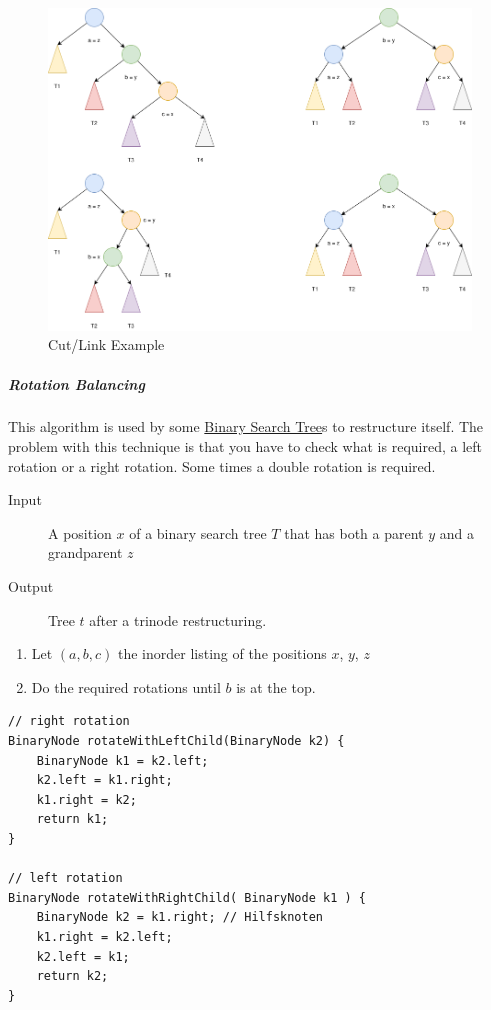 \documentclass[11pt,twoside,twocolumn,landscape]{article}
\begin{document}
\begin{figure}[htbp]
\centering
\includegraphics[width=.9\linewidth]{img/cut_link.drawio.png}
\caption{\label{fig:org7f64437}Cut/Link Example}
\end{figure}

\subparagraph{Rotation Balancing}
\label{sec:org3030ff9}

This algorithm is used by some \href{../../../roam/20211008140953-binary_search_tree.org}{Binary Search Tree}s to restructure itself.
The problem with this technique is that you have to check what is required, a left rotation or a right rotation.
Some times a double rotation is required. 


\begin{description}
\item[{Input}] A position \(x\) of a binary search tree \(T\) that has both a parent \(y\) and a grandparent \(z\)
\item[{Output}] Tree \(t\) after a trinode restructuring.
\end{description}


\begin{enumerate}
\item Let \((a, b, c)\) the inorder listing of the positions \(x\), \(y\), \(z\)
\item Do the required rotations until \(b\) is at the top.
\end{enumerate}


\lstset{language=java,label= ,caption= ,captionpos=b,numbers=none}
\begin{lstlisting}
// right rotation
BinaryNode rotateWithLeftChild(BinaryNode k2) {
    BinaryNode k1 = k2.left;
    k2.left = k1.right;
    k1.right = k2;
    return k1;
}

// left rotation
BinaryNode rotateWithRightChild( BinaryNode k1 ) {
    BinaryNode k2 = k1.right; // Hilfsknoten
    k1.right = k2.left;
    k2.left = k1;
    return k2;
}
\end{lstlisting}
\end{document}
